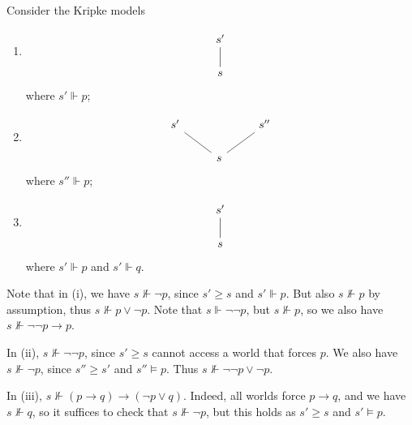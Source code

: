 \begin{example}
    Consider the Kripke models
    \begin{enumerate}
        \item %
        \[\begin{tikzcd}
            {s'} \\
            s
            \arrow[no head, from=2-1, to=1-1]
        \end{tikzcd}\]
            where \( s' \Vdash p \);
        \item %
        \[\begin{tikzcd}
            {s'} && {s''} \\
            & s
            \arrow[no head, from=2-2, to=1-1]
            \arrow[no head, from=2-2, to=1-3]
        \end{tikzcd}\]
        where \( s'' \Vdash p \);
        \item %
        \[\begin{tikzcd}
            {s'} \\
            s
            \arrow[no head, from=2-1, to=1-1]
        \end{tikzcd}\]
            where \( s' \Vdash p \) and \( s' \Vdash q \).
    \end{enumerate}
    Note that in (i), we have \( s \nVdash \neg p \), since \( s' \geq s \) and \( s' \Vdash p \).
    But also \( s \nVdash p \) by assumption, thus \( s \nVdash p \vee \neg p \).
    Note that \( s \Vdash \neg\neg p \), but \( s \nVdash p \), so we also have \( s \nVdash \neg\neg p \to p \).

    In (ii), \( s \nVdash \neg\neg p \), since \( s' \geq s \) cannot access a world that forces \( p \).
    We also have \( s \nVdash \neg p \), since \( s'' \geq s' \) and \( s'' \vDash p \).
    Thus \( s \nVdash \neg\neg p \vee \neg p \).

    In (iii), \( s \nVdash (p \to q) \to (\neg p \vee q) \).
    Indeed, all worlds force \( p \to q \), and we have \( s \nVdash q \), so it suffices to check that \( s \nVdash \neg p \), but this holds as \( s' \geq s \) and \( s' \vDash p \).
\end{example}
